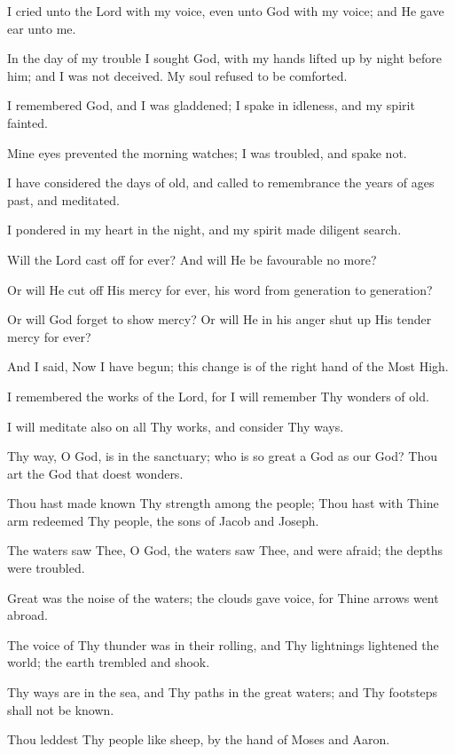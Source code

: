 I cried unto the Lord with my voice, even unto God with my voice; and He gave ear unto me.

In the day of my trouble I sought God, with my hands lifted up by night before him; and I was not deceived. My soul refused to be comforted.

I remembered God, and I was gladdened; I spake in idleness, and my spirit fainted.

Mine eyes prevented the morning watches; I was troubled, and spake not.

I have considered the days of old, and called to remembrance the years of ages past, and meditated.

I pondered in my heart in the night, and my spirit made diligent search.

Will the Lord cast off for ever? And will He be favourable no more?

Or will He cut off His mercy for ever, his word from generation to generation?

Or will God forget to show mercy? Or will He in his anger shut up His tender mercy for ever?

And I said, Now I have begun; this change is of the right hand of the Most High.

I remembered the works of the Lord, for I will remember Thy wonders of old.

I will meditate also on all Thy works, and consider Thy ways.

Thy way, O God, is in the sanctuary; who is so great a God as our God? Thou art the God that doest wonders.

Thou hast made known Thy strength among the people; Thou hast with Thine arm redeemed Thy people, the sons of Jacob and Joseph.

The waters saw Thee, O God, the waters saw Thee, and were afraid; the depths were troubled.

Great was the noise of the waters; the clouds gave voice, for Thine arrows went abroad.

The voice of Thy thunder was in their rolling, and Thy lightnings lightened the world; the earth trembled and shook.

Thy ways are in the sea, and Thy paths in the great waters; and Thy footsteps shall not be known.

Thou leddest Thy people like sheep, by the hand of Moses and
Aaron.
